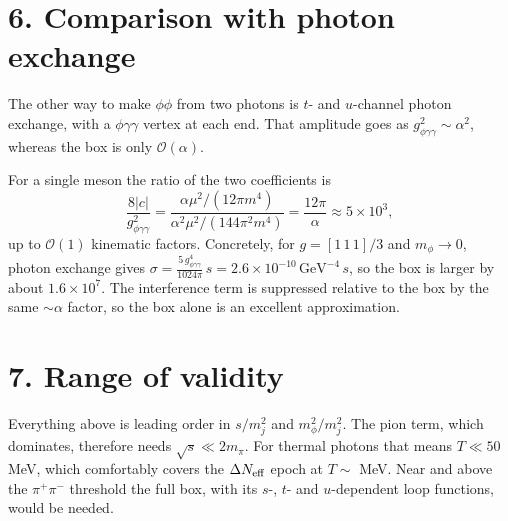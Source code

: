 \documentclass[11pt]{article}
\begin{document}
\section*{6. Comparison with photon exchange}
The other way to make $\phi\phi$ from two photons is $t$- and $u$-channel
photon exchange, with a $\phi\gamma\gamma$ vertex at each end. That amplitude
goes as $g_{\phi\gamma\gamma}^2\sim\alpha^2$, whereas the box is only
$\mathcal O(\alpha)$.
\begin{center}
\end{center} For a single meson the ratio of the two coefficients is
\begin{equation}
  \frac{8|c|}{g_{\phi\gamma\gamma}^2}
  = \frac{\alpha\mu^2/(12\pi m^4)}{\alpha^2\mu^2/(144\pi^2 m^4)}
  = \frac{12\pi}{\alpha}\approx 5\times10^{3},
\end{equation}
up to $\mathcal O(1)$ kinematic factors. Concretely, for $g=[1\,1\,1]/3$ and
$m_\phi\to0$, photon exchange gives
$\sigma = \frac{5\,g_{\phi\gamma\gamma}^4}{1024\pi}\,s = 2.6\times10^{-10}\,\text{GeV}^{-4}\,s$,
so the box is larger by about $1.6\times10^{7}$. The interference term is
suppressed relative to the box by the same $\sim\!\alpha$ factor, so the box
alone is an excellent approximation.

\section*{7. Range of validity}
Everything above is leading order in $s/m_j^2$ and $m_\phi^2/m_j^2$. The pion
term, which dominates, therefore needs $\sqrt s\ll 2m_\pi$. For thermal photons
that means $T\ll 50$ MeV, which comfortably covers the $\Delta N_{\rm eff}$
epoch at $T\sim$ MeV. Near and above the $\pi^+\pi^-$ threshold the full box,
with its $s$-, $t$- and $u$-dependent loop functions, would be needed.
\end{document}
